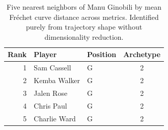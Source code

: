\begin{table}[htbp]
  \centering\small
  \begin{tabular}{rllc}
    \toprule
    Rank & Player & Position & Archetype \\
    \midrule
    1 & Sam Cassell & G & 2 \\
    2 & Kemba Walker & G & 2 \\
    3 & Jalen Rose & G & 2 \\
    4 & Chris Paul & G & 2 \\
    5 & Charlie Ward & G & 2 \\
    \bottomrule
  \end{tabular}
  \caption{Five nearest neighbors of Manu Ginobili by mean Fr\'{e}chet curve distance across metrics. Identified purely from trajectory shape without dimensionality reduction.}
  \label{tab:Manu_Ginobili_frechet_curve_neighbors}
\end{table}


